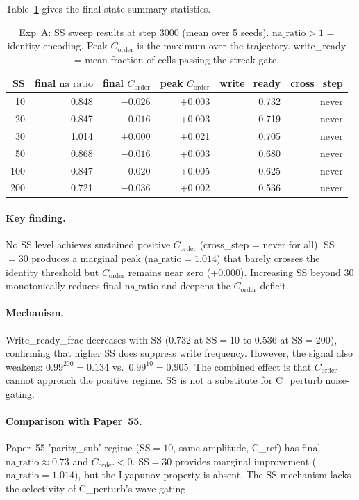 \documentclass[11pt,a4paper]{article}
\newcommand{\Corder}{C_{\mathrm{order}}}
\newcommand{\na}{\mathrm{na\_ratio}}
\begin{document}
Table~\ref{tab:expa} gives the final-state summary statistics.

\begin{table}[h]
\centering
\caption{Exp~A: SS sweep results at step 3000 (mean over 5 seeds).
$\na>1$ = identity encoding. Peak $\Corder$ is the maximum over the trajectory.
write\_ready = mean fraction of cells passing the streak gate.}
\label{tab:expa}
\begin{tabular}{rrrrrr}
\toprule
SS & final $\na$ & final $\Corder$ & peak $\Corder$ & write\_ready & cross\_step \\
\midrule
 10 & 0.848 & $-0.026$ & +0.003 & 0.732 & never \\
 20 & 0.847 & $-0.016$ & +0.003 & 0.719 & never \\
 30 & 1.014 & $+0.000$ & +0.021 & 0.705 & never \\
 50 & 0.868 & $-0.016$ & +0.003 & 0.680 & never \\
100 & 0.847 & $-0.020$ & +0.005 & 0.625 & never \\
200 & 0.721 & $-0.036$ & +0.002 & 0.536 & never \\
\bottomrule
\end{tabular}
\end{table}

\paragraph{Key finding.}
No SS level achieves sustained positive $\Corder$ (cross\_step = never for all).
SS$=30$ produces a marginal peak ($\na=1.014$) that barely crosses the identity
threshold but $\Corder$ remains near zero ($+0.000$).
Increasing SS beyond 30 monotonically reduces final $\na$ and deepens the
$\Corder$ deficit.

\paragraph{Mechanism.}
Write\_ready\_frac decreases with SS (0.732 at SS$=10$ to 0.536 at SS$=200$),
confirming that higher SS does suppress write frequency.
However, the signal also weakens: $0.99^{200} = 0.134$ vs.\ $0.99^{10} = 0.905$.
The combined effect is that $\Corder$ cannot approach the positive regime.
SS is not a substitute for C\_perturb noise-gating.

\paragraph{Comparison with Paper~55.}
Paper~55 'parity\_sub' regime (SS$=10$, same amplitude, C\_ref) has final
$\na \approx 0.73$ and $\Corder < 0$. SS$=30$ provides marginal improvement
($\na=1.014$), but the Lyapunov property is absent. The SS mechanism lacks the
selectivity of C\_perturb's wave-gating.
\end{document}
